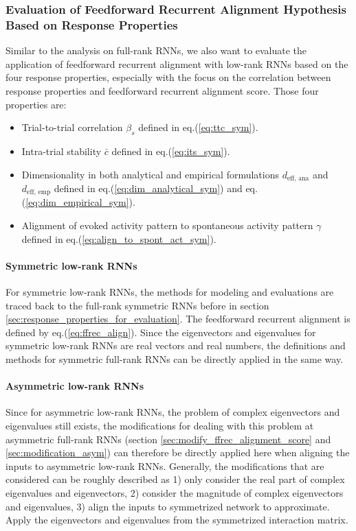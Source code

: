 \documentclass[11pt]{article}
\begin{document}
	\subsubsection{Evaluation of Feedforward Recurrent Alignment Hypothesis Based on Response Properties}
	Similar to the analysis on full-rank RNNs, we also want to evaluate the application of feedforward recurrent alignment with low-rank RNNs based on the four response properties, especially with the focus on the correlation between response properties and feedforward recurrent alignment score. Those four properties are:
		\begin{itemize}
			\item Trial-to-trial correlation $\beta_s$ defined in eq.(\ref{eq:ttc_sym}).
			\item Intra-trial stability $\bar{c}$ defined in eq.(\ref{eq:its_sym}).
			\item Dimensionality in both analytical and empirical formulations $d_{\text{eff, ana}}$ and $d_{\text{eff, emp}}$ defined in eq.(\ref{eq:dim_analytical_sym}) and eq.(\ref{eq:dim_empirical_sym}). 
			\item Alignment of evoked activity pattern to spontaneous activity pattern $\gamma$ defined in eq.(\ref{eq:align_to_spont_act_sym}).
		\end{itemize}
	
	\paragraph{Symmetric low-rank RNNs} For symmetric low-rank RNNs, the methods for modeling and evaluations are traced back to the full-rank symmetric RNNs before in section \ref{sec:response_properties_for_evaluation}. The feedforward recurrent alignment is defined by eq.(\ref{eq:ffrec_align}). Since the eigenvectors and eigenvalues for symmetric low-rank RNNs are real vectors and real numbers, the definitions and methods for symmetric full-rank RNNs can be directly applied in the same way. 
	
	\paragraph{Asymmetric low-rank RNNs} Since for asymmetric low-rank RNNs, the problem of complex eigenvectors and eigenvalues still exists, the modifications for dealing with this problem at asymmetric full-rank RNNs (section \ref{sec:modify_ffrec_alignment_score} and \ref{sec:modification_asym}) can therefore be directly applied here when aligning the inputs to asymmetric low-rank RNNs. Generally, the modifications that are considered can be roughly described as 1) only consider the real part of complex eigenvalues and eigenvectors, 2) consider the magnitude of complex eigenvectors and eigenvalues, 3) align the inputs to symmetrized network to approximate. Apply the eigenvectors and eigenvalues from the symmetrized interaction matrix.
	
\end{document}
